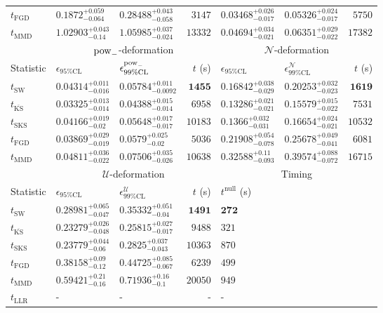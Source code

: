 \begin{tabular}{l|llr|llr}
	$t_{\mathrm{FGD}}$ & $0.1872_{-0.064}^{+0.059}$ & $0.28488_{-0.058}^{+0.043}$ & $3147$ & ${\mathbf{0.03468_{-0.017}^{+0.026}}}$ & $0.05326_{-0.017}^{+0.024}$ & $5750$ \\
	$t_{\mathrm{MMD}}$ & $1.02903_{-0.14}^{+0.043}$ & $1.05985_{-0.024}^{+0.037}$ & $13332$ & $0.04694_{-0.021}^{+0.034}$ & $0.06351_{-0.022}^{+0.029}$ & $17382$ \\
	\toprule
	\multicolumn{1}{c}{} & \multicolumn{3}{c}{$\rm{pow}_{-}$-deformation} & \multicolumn{3}{c}{$\mathcal{N}$-deformation} \\
	Statistic & $\epsilon_{95\%\mathrm{CL}}$ & $\epsilon^  {\rm{pow}_{-}}_{99\%\mathrm{CL}}$ & $t$ (s) & $\epsilon_{95\%\mathrm{CL}}$ & $\epsilon^    {\mathcal{N}}_{99\%\mathrm{CL}}$ & $t$ (s) \\
	\midrule
	$t_{\mathrm{SW}}$ & $0.04314_{-0.016}^{+0.011}$ & $0.05784_{-0.0092}^{+0.011}$ & ${\mathbf{1455}}$ & $0.16842_{-0.029}^{+0.038}$ & $0.20253_{-0.023}^{+0.032}$ & ${\mathbf{1619}}$ \\
	$t_{\overline{\mathrm{KS}}}$ & ${\mathbf{0.03325_{-0.014}^{+0.013}}}$ & ${\mathbf{0.04388_{-0.014}^{+0.015}}}$ & $6958$ & ${\mathbf{0.13286_{-0.021}^{+0.021}}}$ & ${\mathbf{0.15579_{-0.022}^{+0.015}}}$ & $7531$ \\
	$t_{\mathrm{SKS}}$ & $0.04166_{-0.02}^{+0.019}$ & $0.05648_{-0.017}^{+0.017}$ & $10183$ & $0.1366_{-0.031}^{+0.032}$ & $0.16654_{-0.021}^{+0.024}$ & $10532$ \\
	$t_{\mathrm{FGD}}$ & $0.03869_{-0.019}^{+0.029}$ & $0.0579_{-0.02}^{+0.025}$ & $5036$ & $0.21908_{-0.078}^{+0.054}$ & $0.25678_{-0.041}^{+0.049}$ & $6081$ \\
	$t_{\mathrm{MMD}}$ & $0.04811_{-0.022}^{+0.036}$ & $0.07506_{-0.026}^{+0.035}$ & $10638$ & $0.32588_{-0.093}^{+0.11}$ & $0.39574_{-0.072}^{+0.088}$ & $16715$ \\
	\toprule
	\multicolumn{1}{c}{} & \multicolumn{3}{c}{$\mathcal{U}$-deformation} & \multicolumn{3}{c}{Timing} \\
	Statistic & $\epsilon_{95\%\mathrm{CL}}$ & $\epsilon^    {\mathcal{U}}_{99\%\mathrm{CL}}$ & $t$ (s) & $t^{\mathrm{null}}$ (s) \\
	\midrule
	$t_{\mathrm{SW}}$ & $0.28981_{-0.047}^{+0.065}$ & $0.35332_{-0.04}^{+0.051}$ & ${\mathbf{1491}}$ & ${\mathbf{272}}$ \\
	$t_{\overline{\mathrm{KS}}}$ & ${\mathbf{0.23279_{-0.048}^{+0.026}}}$ & ${\mathbf{0.25815_{-0.017}^{+0.027}}}$ & $9488$ & $321$ \\
	$t_{\mathrm{SKS}}$ & $0.23779_{-0.06}^{+0.044}$ & $0.2825_{-0.043}^{+0.037}$ & $10363$ & $870$ \\
	$t_{\mathrm{FGD}}$ & $0.38158_{-0.12}^{+0.09}$ & $0.44725_{-0.067}^{+0.085}$ & $6239$ & $499$ \\
	$t_{\mathrm{MMD}}$ & $0.59421_{-0.16}^{+0.21}$ & $0.71936_{-0.1}^{+0.16}$ & $20050$ & $949$ \\
	$t_{\mathrm{LLR}}$ & - & - & - & - \\
	\bottomrule
\end{tabular}